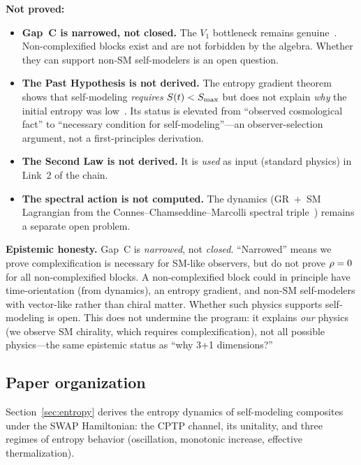 \medskip
\noindent\textbf{Not proved:}
\begin{itemize}
  \item \textbf{Gap~C is narrowed, not closed.}  The $V_1$
    bottleneck remains genuine~\cite{BGW2020}.  Non-complexified blocks
    exist and are not forbidden by the algebra.  Whether they can
    support non-SM self-modelers is an open question.
  \item \textbf{The Past Hypothesis is not derived.}  The entropy
    gradient theorem shows that self-modeling \emph{requires}
    $S(t) < S_{\max}$ but does not explain \emph{why} the initial entropy
    was low~\cite{Penrose1979,Albert2000}.  Its status is elevated from
    ``observed cosmological fact'' to ``necessary condition for
    self-modeling''---an observer-selection argument, not a
    first-principles derivation.
  \item \textbf{The Second Law is not derived.}  It is \emph{used} as
    input (standard physics) in Link~2 of the chain.
  \item \textbf{The spectral action is not computed.}  The dynamics
    (GR~+~SM Lagrangian from the Connes--Chamseddine--Marcolli spectral
    triple~\cite{CCM2007}) remains a separate open problem.
\end{itemize}

\medskip
\noindent\textbf{Epistemic honesty.}
Gap~C is \emph{narrowed}, not \emph{closed}.  ``Narrowed'' means
we prove complexification is necessary for SM-like observers, but
do not prove $\rho = 0$ for all non-complexified blocks.  A
non-complexified block could in principle have time-orientation
(from dynamics), an entropy gradient, and non-SM self-modelers with
vector-like rather than chiral matter.  Whether such physics supports
self-modeling is open.  This does not undermine the program: it
explains \emph{our} physics (we observe SM chirality, which requires
complexification), not all possible physics---the same epistemic
status as ``why 3+1 dimensions?''

\subsection{Paper organization}\label{sec:intro-outline}

Section~\ref{sec:entropy} derives the entropy dynamics of self-modeling
composites under the SWAP Hamiltonian: the CPTP channel, its unitality,
and three regimes of entropy behavior (oscillation, monotonic increase,
effective thermalization).

